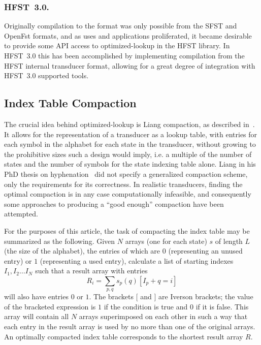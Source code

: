 \documentclass{llncs}
\begin{document}
\subsubsection{HFST~3.0.}
Originally compilation to the format was only possible from the SFST and OpenFst
formats, and as uses and applications proliferated, it became desirable to
provide some API access to optimized-lookup in the HFST library. In HFST~3.0
this has been accomplished by implementing compilation from the HFST internal
transducer format, allowing for a great degree of integration with
HFST~3.0 supported tools.

\subsection{Index Table Compaction}
The crucial idea behind optimized-lookup is Liang compaction, as described in~\cite{silfverberg/2009}. It allows for the representation of a transducer as
a lookup table, with entries for each symbol in the alphabet for each state
in the transducer, without growing to the prohibitive sizes such a design
would imply, i.e. a multiple of the number of states and the number of symbols for
the state indexing table alone. Liang in his PhD thesis on hyphenation~\cite{liang/1983} did not specify a generalized compaction scheme, only the
requirements for its correctness. In realistic transducers, finding the optimal
compaction is in any case computationally infeasible, and consequently some approaches to
producing a ``good enough'' compaction have been attempted.

For the purposes of this article, the task of compacting the index table may
be summarized as the following. Given $N$ arrays (one for each state) $s$ of
length $L$ (the size of the alphabet), the
entries of which are $0$ (representing an unused entry) or $1$ (representing a
used entry), calculate a list of starting indexes $I_1, I_2 \ldots I_N$ such
that a result array with entries
\begin{equation}
R_i = \displaystyle\sum\limits_{p, q} s_p(q) [I_p + q = i]
\end{equation} will also have
entries $0$ or $1$. The brackets $[$ and $]$ are Iverson brackets; the value of the bracketed
expression is $1$ if the condition is true and $0$ if it is false. This
array will contain all $N$ arrays superimposed on each other in such a way
that each entry in the result array is used by no more than one of the original
arrays. An optimally compacted index table corresponds to the shortest result
array $R$.
\end{document}
